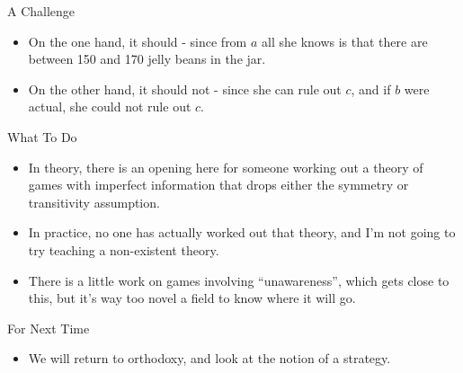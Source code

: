 \documentclass[
  ignorenonframetext,
]{beamer}
\providecommand{\tightlist}{%
  \setlength{\itemsep}{0pt}\setlength{\parskip}{0pt}}
\begin{document}
\begin{frame}{A Challenge}
\protect\hypertarget{a-challenge}{}
\begin{itemize}
\tightlist
\item
  On the one hand, it should - since from \(a\) all she knows is that
  there are between 150 and 170 jelly beans in the jar.
\item
  On the other hand, it should not - since she can rule out \(c\), and
  if \(b\) were actual, she could not rule out \(c\).
\end{itemize}
\end{frame}

\begin{frame}{What To Do}
\protect\hypertarget{what-to-do}{}
\begin{itemize}
\tightlist
\item
  In theory, there is an opening here for someone working out a theory
  of games with imperfect information that drops either the symmetry or
  transitivity assumption.
\item
  In practice, no one has actually worked out that theory, and I'm not
  going to try teaching a non-existent theory.
\item
  There is a little work on games involving ``unawareness'', which gets
  close to this, but it's way too novel a field to know where it will
  go.
\end{itemize}
\end{frame}

\begin{frame}{For Next Time}
\protect\hypertarget{for-next-time}{}
\begin{itemize}
\tightlist
\item
  We will return to orthodoxy, and look at the notion of a strategy.
\end{itemize}
\end{frame}
\end{document}
